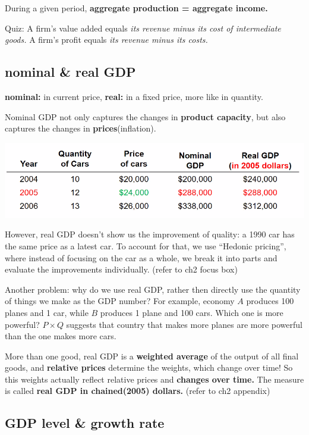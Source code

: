 \documentclass[11pt, a4paper]{ECON2123}
\begin{document}
\begin{spacing}{1.5}
    During a given period, {\bf aggregate production = aggregate income.}

    Quiz: A firm's value added equals 
    {\it {its revenue minus its cost of intermediate goods.}}
    A firm's profit equals {\it {its revenue minus its costs.}}

    \subsection{nominal \& real GDP}

    {\bf nominal: } in current price, {\bf real:} in a fixed price,
    more like in quantity.

    Nominal GDP not only captures the changes in {\bf product capacity},
    but also captures the changes in {\bf prices}(inflation).
    \begin{center}
        \includegraphics[scale=0.8]{images/0102-nominal-real-gdp.png}
    \end{center}
    However, real GDP doesn't show us the improvement of quality:
    a 1990 car has the same price as a latest car.
    To account for that, we use ``Hedonic pricing'', where 
    instead of focusing on the car as a whole, we break it 
    into parts and evaluate the improvements individually.
    (refer to ch2 focus box)

    Another problem: why do we use real GDP, rather then directly 
    use the quantity of things we make as the GDP number?
    For example, economy $A$ produces 100 planes and 1 car, while $B$
    produces 1 plane and 100 cars. Which one is more powerful?
    $P\times Q$ suggests that country that makes more planes are 
    more powerful than the one makes more cars.

    More than one good, real GDP is a {\bf weighted average} 
    of the output of all final goods, and {\bf relative prices}
    determine the weights, which change over time!
    So this weights actually reflect relative prices 
    and {\bf changes over time.}
    The measure is called {\bf real GDP in chained(2005) dollars.} (refer to ch2 
    appendix)

    \subsection{GDP level \& growth rate}


\end{spacing}
\end{document}
